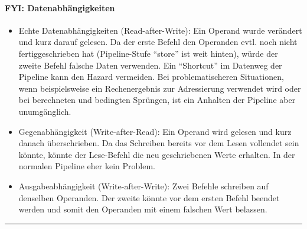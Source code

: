 		\paragraph{FYI: Datenabhängigkeiten}
			\begin{itemize}
				\item Echte Datenabhängigkeiten (Read-after-Write): Ein Operand wurde verändert und kurz darauf gelesen. Da der erste Befehl den Operanden evtl. noch nicht fertiggeschrieben hat (Pipeline-Stufe "`store"' ist weit hinten), würde der zweite Befehl falsche Daten verwenden. Ein "`Shortcut"' im Datenweg der Pipeline kann den Hazard vermeiden. Bei problematischeren Situationen, wenn beispielsweise ein Rechenergebnis zur Adressierung verwendet wird oder bei berechneten und bedingten Sprüngen, ist ein Anhalten der Pipeline aber unumgänglich.
				\item Gegenabhängigkeit (Write-after-Read): Ein Operand wird gelesen und kurz danach überschrieben. Da das Schreiben bereits vor dem Lesen vollendet sein könnte, könnte der Lese-Befehl die neu geschriebenen Werte erhalten. In der normalen Pipeline eher kein Problem.
				\item Ausgabeabhängigkeit (Write-after-Write): Zwei Befehle schreiben auf denselben Operanden. Der zweite könnte vor dem ersten Befehl beendet werden und somit den Operanden mit einem falschen Wert belassen.
			\end{itemize}
		\par\noindent\rule{\textwidth}{0.4pt}

